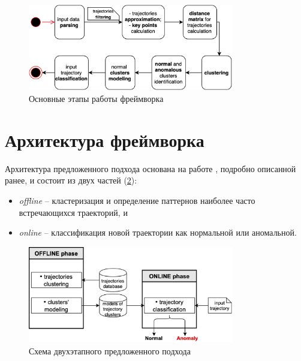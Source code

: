 \begin{figure}[!htb]
	\centering{}
	\includegraphics[width=0.8\textwidth]{images/flowchart.png}
	\caption{Основные этапы работы фреймворка}
	\label{fig:flowchart}
\end{figure}

\section{Архитектура фреймворка}

Архитектура предложенного подхода основана на работе \cite{inproceedings:7_related_work}, подробно описанной ранее, и состоит из двух частей (\ref{fig:str}):

\begin{itemize}
	\item \textit{offline} -- кластеризация и определение паттернов наиболее часто встречающихся траекторий, и
	\item \textit{online} -- классификация новой траектории как нормальной или аномальной.
\end{itemize}

\begin{figure}[!htb]
	\centering{}
	\includegraphics[width=0.8\textwidth]{images/str.png}
	\caption{Схема двухэтапного предложенного подхода}
	\label{fig:str}
\end{figure}

